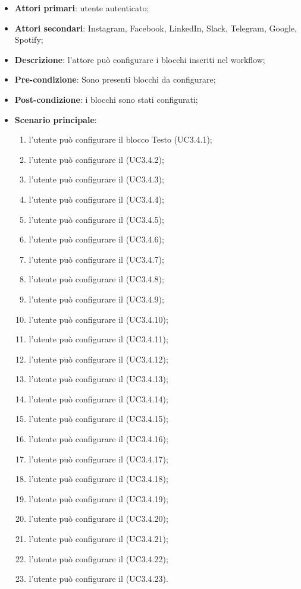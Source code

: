 \begin{itemize}
\item \textbf{Attori primari}: utente autenticato;

\item \textbf{Attori secondari}: Instagram, Facebook, LinkedIn, Slack, Telegram, Google, Spotify;

\item \textbf{Descrizione}: l'attore può configurare i blocchi inseriti nel workflow;

\item \textbf{Pre-condizione}: Sono presenti blocchi da configurare;

\item \textbf{Post-condizione}:  i blocchi sono stati configurati;

\item \textbf{Scenario principale}:
\begin{enumerate}
\item l'utente può configurare il blocco Testo (UC3.4.1);
\item l'utente può configurare il \BFeedRSS{} (UC3.4.2);
\item l'utente può configurare il \BFiltro{} (UC3.4.3);
\item l'utente può configurare il \BMeteo{} (UC3.4.4);
\item l'utente può configurare il \BInstagram{} (UC3.4.5);
\item l'utente può configurare il \BFacebook{} (UC3.4.6);
\item l'utente può configurare il \BMessenger{} (UC3.4.7);
\item l'utente può configurare il \BLinkedIn{} (UC3.4.8);
\item l'utente può configurare il \BSveglia{} (UC3.4.9);
\item l'utente può configurare il \BSlack{} (UC3.4.10);
\item l'utente può configurare il \BTelegram{} (UC3.4.11);
\item l'utente può configurare il \BMail{} (UC3.4.12);
\item l'utente può configurare il \BCalendario{} (UC3.4.13);
\item l'utente può configurare il \BYouTube{} (UC3.4.14);
\item l'utente può configurare il \BYouTubeMusic{} (UC3.4.15);
\item l'utente può configurare il \BRadio{} (UC3.4.16);
\item l'utente può configurare il \BTV{} (UC3.4.17);
\item l'utente può configurare il \BSpotify{} (UC3.4.18);
\item l'utente può configurare il \BCinema{} (UC3.4.19);
\item l'utente può configurare il \BTrasporti{} (UC3.4.20);
\item l'utente può configurare il \BLista{} (UC3.4.21);
\item l'utente può configurare il \BSicurezza{} (UC3.4.22);
\item l'utente può configurare il \BKindle{} (UC3.4.23).


\end{enumerate}
\end{itemize}
